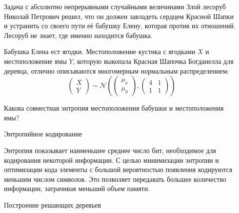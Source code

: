 \documentclass[final]{beamer}
\newlength{\onecolwid}
\newlength{\twocolwid}
\begin{document}
\begin{frame}[t]
\begin{columns}[t]
\begin{column}{\twocolwid}
\begin{columns}[t,totalwidth=\twocolwid]
\begin{column}{\onecolwid}
\end{column} %

\begin{column}{\onecolwid}\vspace{-.6in} %

\begin{alertblock}{Задача с абсолютно непрерывными случайными величинами}
	Злой лесоруб Николай Петрович решил, что он должен завладеть сердцем Красной Шапки и устранить со своего пути её бабушку Елену, которая против их отношений. Лесоруб не знает, где именно находится бабушка.

Бабушка Елена ест ягодки. Местоположение кустика с ягодками $X$ и местоположение ямы $Y$, которую выкопала Красная Шапочка Богданелла для деревца, отлично описываются многомерным нормальным распределением:
\[\begin{pmatrix} 
    X \\ 
    Y 
  \end{pmatrix}\sim \mathcal{N}\left(\begin{pmatrix} 
      \mu _x \\ 
      \mu _y 
    \end{pmatrix},
    \begin{pmatrix} 
      4 & 1 \\ 
      1 & 1
    \end{pmatrix}\right)\]

Какова совместная энтропия местоположения бабушки и местоположения ямы?
\end{alertblock}

\begin{block}{Энтропийное кодирование}


Энтропия показывает наименьшее среднее число бит, необходимое для кодирования некоторой информации. С целью минимизации энтропии и оптимизации кода элементы с большой вероятностью появления кодируются меньшим числом символов. Это позволяет передавать большее количество информации, затрачивая меньший объем памяти.
\end{block}
\begin{block}{Построение решающих деревьев}


\end{block}
\end{column}
\end{columns}
\end{column}
\end{columns}
\end{frame}
\end{document}
